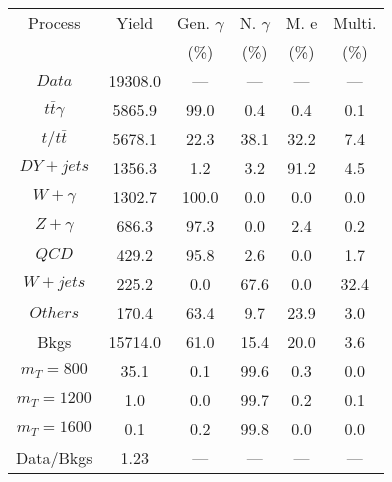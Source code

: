 \begin{figure}
\begin{minipage}[c]{0.32\textwidth}
{\begin{tabular}{cccccc}
\hline
Process & Yield & Gen. $\gamma$ & N. $\gamma$ & M. e & Multi. \\
 &  & (\%) & (\%) & (\%) & (\%)  \\
\hline
                                                                      $ Data $ &  19308.0 &  --- &  --- &  --- &  ---\\
$ t\bar{t}\gamma $ &  5865.9 &  99.0 &  0.4 &  0.4 &  0.1\\
$ t/t\bar{t} $ &  5678.1 &  22.3 &  38.1 &  32.2 &  7.4\\
$ DY+jets $ &  1356.3 &  1.2 &  3.2 &  91.2 &  4.5\\
$ W+\gamma $ &  1302.7 &  100.0 &  0.0 &  0.0 &  0.0\\
$ Z+\gamma $ &  686.3 &  97.3 &  0.0 &  2.4 &  0.2\\
$ QCD $ &  429.2 &  95.8 &  2.6 &  0.0 &  1.7\\
$ W+jets $ &  225.2 &  0.0 &  67.6 &  0.0 &  32.4\\
$ Others $ &  170.4 &  63.4 &  9.7 &  23.9 &  3.0\\
Bkgs &  15714.0 &  61.0 &  15.4 &  20.0 &  3.6\\
$ m_{T} = 800 $ &  35.1 &  0.1 &  99.6 &  0.3 &  0.0\\
$ m_{T} = 1200 $ &  1.0 &  0.0 &  99.7 &  0.2 &  0.1\\
$ m_{T} = 1600 $ &  0.1 &  0.2 &  99.8 &  0.0 &  0.0\\
Data/Bkgs &  1.23 &  --- &  --- &  --- &  ---\\
\hline
\end{tabular}
}
\end{minipage}
\end{figure}

